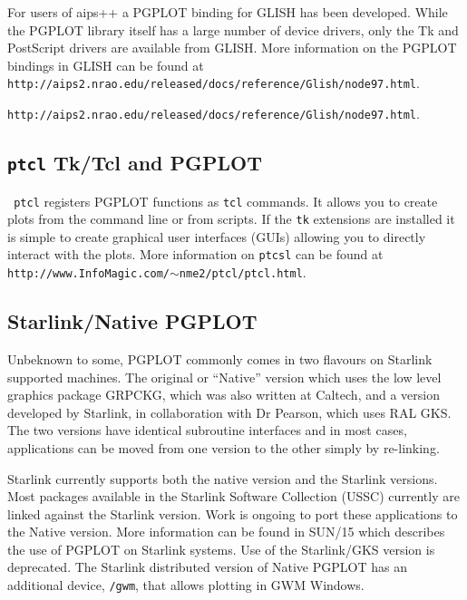 \documentclass[twoside,11pt]{article}
\newcommand{\htmladdnormallink}[2]{#1}
\newcommand{\htmlref}[2]{#1}
\newcommand{\latex}[1]{#1}
\newcommand{\xref}[3]{#1}
\newcommand{\xlabel}[1]{}
\begin{document}
For users of aips++ a PGPLOT binding for
\htmladdnormallink{GLISH}{http://www.cv.nrao.edu/glish/} has been
developed. While the PGPLOT library itself has a large number of
device drivers, only the Tk and PostScript drivers are available from
GLISH. More information on the PGPLOT bindings in GLISH can be found
at \latex{{\tt
http://aips2.nrao.edu/released/docs/reference/Glish/node97.html}.}
\begin{htmlonly} 
\htmladdnormallink{{\tt http://aips2.nrao.edu/released/docs/reference/Glish/node97.html}}{http://aips2.nrao.edu/released/docs/reference/Glish/node97.html}.
\end{htmlonly} 

\subsection{\xlabel{sc15_pgtcl}{\tt ptcl} Tk/Tcl and PGPLOT\label{sc15_pgtcl}}

\htmladdnormallink{{\tt
ptcl}}{http://www.InfoMagic.com/~nme2/ptcl/ptcl.html} registers PGPLOT
functions as {\tt tcl} commands.  It allows you to create plots from
the command line or from scripts. If the {\tt tk} extensions are
installed it is simple to create graphical user interfaces (GUIs)
allowing you to directly interact with the plots. \latex{ More
information on {\tt ptcsl} can be found at {\tt
http://www.InfoMagic.com/$\sim$nme2/ptcl/ptcl.html}.}

\subsection{\xlabel{sc15_pgstar}Starlink/Native PGPLOT\label{sc15_pgstar}}

Unbeknown to some, PGPLOT commonly comes in two flavours on Starlink
supported machines. The original or ``Native'' version which uses the
low level graphics package GRPCKG, which was also written at Caltech,
and a version developed by Starlink, in collaboration with Dr Pearson,
which uses \htmlref{RAL GKS}{sc15_gks}. The two versions have
identical subroutine interfaces and in most cases, applications can be
moved from one version to the other simply by re-linking. 

Starlink currently supports both the native version and the Starlink
versions. Most packages available in the Starlink Software Collection
(USSC) currently are linked against the Starlink version. Work is
ongoing to port these applications to the Native version. More
information can be found in \xref{SUN/15}{sun15}{} which describes the
use of PGPLOT on Starlink systems. Use of the Starlink/GKS version is
deprecated. The Starlink distributed version of Native PGPLOT has an
additional device, {\tt /gwm}, that allows plotting in GWM Windows.
\end{document}
